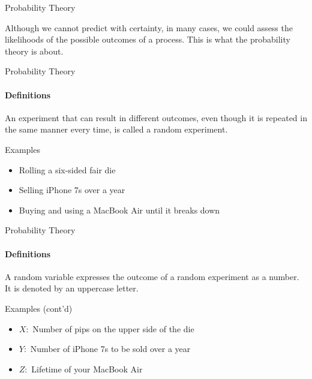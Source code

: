 \documentclass{beamer}\usepackage[]{graphicx}\usepackage[]{color}
\begin{document}
\begin{darkframes}
\begin{frame}[label=lists]{Probability Theory}
	 	
      	Although we cannot predict with certainty, in many cases, we could assess the likelihoods of the possible outcomes of a process.  	
      	This is what the \alert{probability theory} is about.
      
    \end{frame}     
    

	
	\begin{frame}[label=lists]{Probability Theory}
		\framesubtitle{Definitions}

	   	\begin{definition}
        An experiment that can result in different outcomes, even though it is repeated in the same manner every time, is called a \alert{random experiment}.
      	\end{definition} 	
      	
      	\begin{exampleblock}{Examples}
      		\begin{itemize}
        		\item Rolling a six-sided fair die
        		\item Selling iPhone 7s over a year
	       		\item Buying and using a MacBook Air until it breaks down
        	\end{itemize}
        \end{exampleblock}

    \end{frame}
    
    

    \begin{frame}[label=lists]{Probability Theory}
		\framesubtitle{Definitions}    
		\begin{definition}
       		A \alert{random variable} expresses the outcome of a random experiment as a number. It is denoted by an uppercase letter.
      	\end{definition} 	
      	
      	\begin{exampleblock}{Examples (cont'd)}
      		\begin{itemize}
        		\item $X:$ Number of pips on the upper side of the die
        		\item $Y:$ Number of iPhone 7s to be sold over a year 
	       		\item $Z:$ Lifetime of your MacBook Air
        	\end{itemize}
        \end{exampleblock}		
	

\end{frame}
\end{darkframes}
\end{document}
